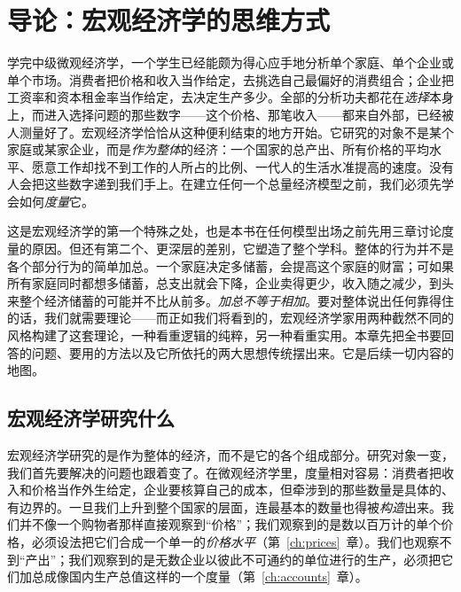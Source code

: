 \chapter{导论：宏观经济学的思维方式}
\label{ch:intro}

学完中级微观经济学，一个学生已经能颇为得心应手地分析单个家庭、单个企业或单个市场。消费者把价格和收入当作给定，去挑选自己最偏好的消费组合；企业把工资率和资本租金率当作给定，去决定生产多少。全部的分析功夫都花在\emph{选择}本身上，而进入选择问题的那些数字——这个价格、那笔收入——都来自外部，已经被人测量好了。宏观经济学恰恰从这种便利结束的地方开始。它研究的对象不是某个家庭或某家企业，而是\emph{作为整体}的经济：一个国家的总产出、所有价格的平均水平、愿意工作却找不到工作的人所占的比例、一代人的生活水准提高的速度。没有人会把这些数字递到我们手上。在建立任何一个总量经济模型之前，我们必须先学会如何\emph{度量}它。

这是宏观经济学的第一个特殊之处，也是本书在任何模型出场之前先用三章讨论度量的原因。但还有第二个、更深层的差别，它塑造了整个学科。整体的行为并不是各个部分行为的简单加总。一个家庭决定多储蓄，会提高这个家庭的财富；可如果所有家庭同时都想多储蓄，总支出就会下降，企业卖得更少，收入随之减少，到头来整个经济储蓄的可能并不比从前多。\emph{加总不等于相加}。要对整体说出任何靠得住的话，我们就需要理论——而正如我们将看到的，宏观经济学家用两种截然不同的风格构建了这套理论，一种看重逻辑的纯粹，另一种看重实用。本章先把全书要回答的问题、要用的方法以及它所依托的两大思想传统摆出来。它是后续一切内容的地图。

\section{宏观经济学研究什么}

宏观经济学研究的是作为整体的经济，而不是它的各个组成部分。研究对象一变，我们首先要解决的问题也跟着变了。在微观经济学里，度量相对容易：消费者把收入和价格当作外生给定，企业要核算自己的成本，但牵涉到的那些数量是具体的、有边界的。一旦我们上升到整个国家的层面，连最基本的数量也得被\emph{构造}出来。我们并不像一个购物者那样直接观察到``价格''；我们观察到的是数以百万计的单个价格，必须设法把它们合成一个单一的\emph{价格水平}（第~\ref{ch:prices}~章）。我们也观察不到``产出''；我们观察到的是无数企业以彼此不可通约的单位进行的生产，必须把它们加总成像国内生产总值这样的一个度量（第~\ref{ch:accounts}~章）。



